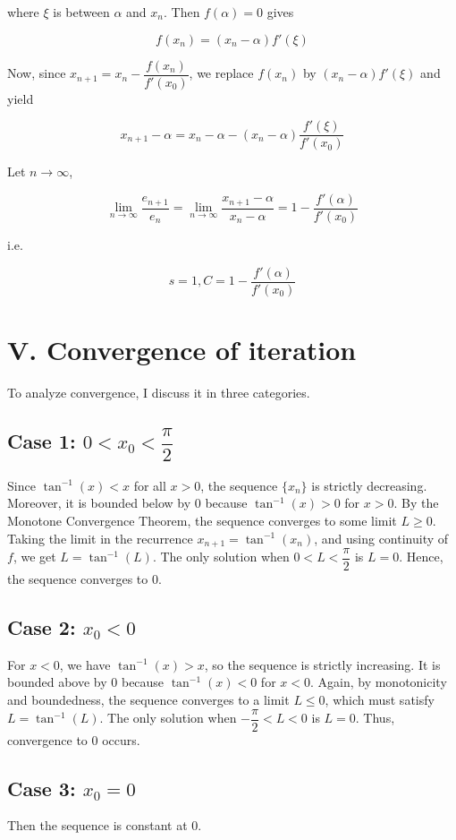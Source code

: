 \documentclass[a4paper]{article}
\begin{document}
where $\xi$ is between $\alpha$ and $x_n$. Then $f(\alpha) = 0$ gives

$$f(x_n) = (x_n -\alpha)f'(\xi)$$

Now, since $x_{n+1} = x_n - \dfrac{f(x_n)}{f'(x_0)}$, we replace $f(x_n)$ by $(x_n -\alpha)f'(\xi)$ and yield

$$x_{n+1} - \alpha = x_n - \alpha - (x_n - \alpha)\dfrac{f'(\xi)}{f'(x_0)}$$

Let $n \rightarrow \infty$,

$$\lim\limits_{n \rightarrow \infty}\dfrac{e_{n+1}}{e_n} = \lim\limits_{n \rightarrow \infty}\dfrac{x_{n+1}-\alpha}{x_n - \alpha} = 1 - \dfrac{f'(\alpha)}{f'(x_0)}$$

i.e.

$$s = 1, C = 1 - \dfrac{f'(\alpha)}{f'(x_0)}$$

\section*{V. Convergence of iteration}

To analyze convergence, I discuss it in three categories.

\subsection*{Case 1: $0 < x_0 < \dfrac\pi2$}
Since \(\tan^{-1}(x) < x\) for all \(x > 0\), the sequence \(\{x_n\}\) is strictly decreasing. Moreover, it is bounded below by 0 because \(\tan^{-1}(x) > 0\) for \(x > 0\). By the Monotone Convergence Theorem, the sequence converges to some limit \(L \geq 0\). Taking the limit in the recurrence \(x_{n+1} = \tan^{-1}(x_n)\), and using continuity of \(f\), we get \(L = \tan^{-1}(L)\). The only solution when $0 < L < \dfrac\pi2$ is \(L = 0\). Hence, the sequence converges to 0.

\subsection*{Case 2: \(x_0 < 0\)}
For \(x < 0\), we have \(\tan^{-1}(x) > x\), so the sequence is strictly increasing. It is bounded above by 0 because \(\tan^{-1}(x) < 0\) for \(x < 0\). Again, by monotonicity and boundedness, the sequence converges to a limit \(L \leq 0\), which must satisfy \(L = \tan^{-1}(L)\). The only solution when $-\dfrac\pi2 < L < 0$ is \(L = 0\). Thus, convergence to 0 occurs.

\subsection*{Case 3: \(x_0 = 0\)}
Then the sequence is constant at 0.
\end{document}
